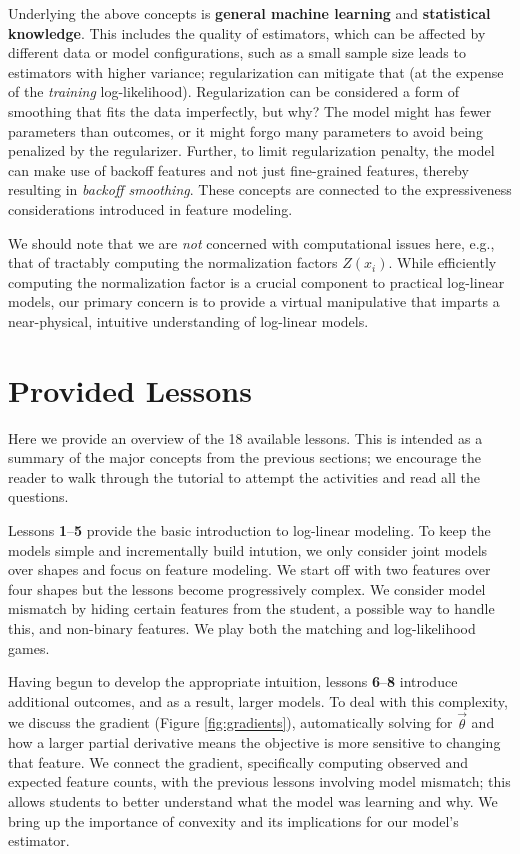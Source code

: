 \documentclass[11pt,letterpaper]{article}
\newcommand{\Note}[1]{}
\renewcommand{\Note}[1]{\hl{[#1]}}  %
\newcommand{\NoteSigned}[3]{{\sethlcolor{#2}\Note{#1: #3}}}
\newcommand{\NoteFF}[1]{\NoteSigned{FF}{LightBlue}{#1}}
\newcommand{\NumLessons}[0]{18}%
\begin{document}
Underlying the above concepts is \textbf{general machine learning} and 
\textbf{statistical knowledge}. This includes the quality of estimators, 
which can be affected by different data or model configurations, such 
as a small sample size leads to estimators with 
higher variance; regularization can mitigate that (at the expense of 
the \textit{training} log-likelihood). 
Regularization can be considered a form of smoothing that fits the data 
imperfectly, but why? The model might has fewer parameters than 
outcomes, or it might forgo many parameters to avoid being penalized by 
the regularizer.  Further, to limit regularization penalty, the model can make 
use of backoff features and not just fine-grained features, thereby resulting 
in \textit{backoff smoothing}. These concepts are connected to the expressiveness 
considerations introduced in feature modeling.

We should note that we are \textit{not} concerned with computational issues here, e.g., that of tractably computing the normalization factors $Z(x_i)$. While efficiently computing the normalization factor is a crucial component to practical log-linear models, our primary concern is to provide a virtual manipulative that imparts a near-physical, intuitive understanding of log-linear models. 



\section{Provided Lessons}\label{sec:lessons}
Here we provide an overview of the \NumLessons{} available lessons. This is intended as a 
summary of the major concepts from the previous sections; we encourage the reader to 
walk through the tutorial to attempt the activities and read all the questions.

Lessons \textbf{1}--\textbf{5} provide the basic introduction to log-linear modeling. To keep 
the models simple and incrementally build intution, we only consider joint models over shapes and focus 
on feature modeling. We start off with two features over four shapes but the lessons 
become progressively complex. We consider model mismatch by hiding certain 
features from the student, a possible way to handle this, and non-binary features. We play both the 
matching and log-likelihood games.

Having begun to develop the appropriate intuition, lessons \textbf{6}--\textbf{8} introduce 
additional outcomes, and as a result, larger models. To deal with this complexity, we discuss the gradient 
(Figure \ref{fig:gradients}), 
automatically solving for $\vec{\theta}$ and how a larger partial derivative means the objective is more 
sensitive to changing that feature. We connect the gradient, specifically computing observed and expected feature 
counts, with the previous lessons involving model mismatch; this allows students to better understand what the 
model was learning and why. 
We bring up the importance of convexity and its implications for our model's estimator.
\end{document}
